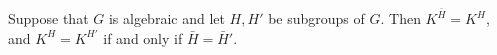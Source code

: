 Suppose that $G$ is algebraic and let $H, H'$ be subgroups of $G$. Then $K^{\bar{H}} = K^H$, and $K^H = K^{H'}$ if and only if $\bar{H} = \bar{H}'$.
